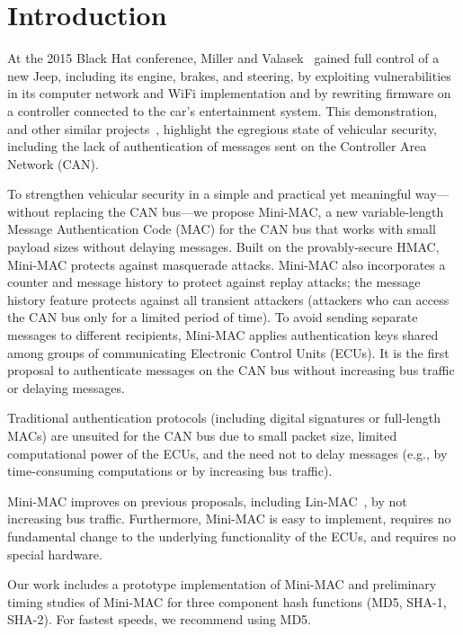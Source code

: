 \section{Introduction}
\label{intro}

At the 2015 Black Hat conference, Miller and Valasek~\cite{blackhat} gained full control of a new Jeep,
including its engine, brakes, and steering, by exploiting vulnerabilities in its
computer network and WiFi implementation and by rewriting firmware on a controller connected to the car's entertainment system.
This demonstration, and other similar 
projects~\cite{Rouf2010,Koscher-2010,Checkoway-2011,Woo-14,C2X}, 
highlight the egregious state of vehicular security, including the lack of 
authentication of messages sent on the Controller Area Network (CAN).   

To strengthen vehicular security in a simple and practical 
yet meaningful way---without replacing the CAN bus---we propose Mini-MAC, 
a new variable-length Message Authentication Code (MAC)
for the CAN bus that works with small payload sizes without delaying messages.  
Built on the provably-secure HMAC, Mini-MAC protects against masquerade attacks.  
Mini-MAC also incorporates a counter and message history to protect against replay attacks;
the message history feature protects against all transient attackers (attackers
who can access the CAN bus only for a limited period of time).
To avoid sending separate messages to different recipients, Mini-MAC applies authentication keys
shared among groups of communicating Electronic Control Units (ECUs).
It is the first proposal to authenticate messages on the CAN bus without increasing bus traffic
or delaying messages. 

Traditional authentication protocols (including digital signatures or full-length MACs) are unsuited for the CAN bus due to
small packet size, limited computational power of the ECUs,
and the need not to delay messages (e.g., by time-consuming computations or by
increasing bus traffic).   

Mini-MAC improves on previous proposals, including Lin-MAC~\cite{Lin-MAC}, by not increasing bus traffic.
Furthermore, Mini-MAC is easy to implement,
requires no fundamental change to the underlying functionality of the ECUs, and 
requires no special hardware.

Our work includes a prototype implementation of Mini-MAC and preliminary timing studies 
of Mini-MAC for three component hash functions (MD5, SHA-1, SHA-2).  For fastest speeds, 
we recommend using MD5.

